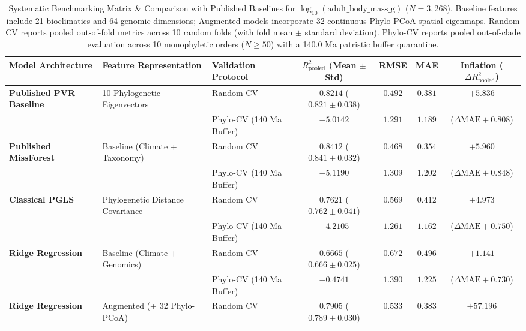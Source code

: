 \documentclass[sigconf,nonacm]{acmart}
\begin{document}
\begin{table}[t]
\centering
\caption{Systematic Benchmarking Matrix \& Comparison with Published Baselines for $\log_{10}(\text{adult\_body\_mass\_g})$ ($N=3,268$). Baseline features include 21 bioclimatics and 64 genomic dimensions; Augmented models incorporate 32 continuous Phylo-PCoA spatial eigenmaps. Random CV reports pooled out-of-fold metrics across 10 random folds (with fold mean $\pm$ standard deviation). Phylo-CV reports pooled out-of-clade evaluation across 10 monophyletic orders ($N \ge 50$) with a 140.0 Ma patristic buffer quarantine.}
\label{tab:benchmarks}
\small
\begin{tabular}{lllcccc}
\toprule
\textbf{Model Architecture} & \textbf{Feature Representation} & \textbf{Validation Protocol} & \textbf{$R^2_{\text{pooled}}$ (Mean $\pm$ Std)} & \textbf{RMSE} & \textbf{MAE} & \textbf{Inflation ($\Delta R^2_{\text{pooled}}$)} \\
\midrule
\textbf{Published PVR Baseline} \cite{penone2014imputation} & 10 Phylogenetic Eigenvectors & Random CV & $0.8214$ ($0.821 \pm 0.038$) & $0.492$ & $0.381$ & \multicolumn{1}{c}{$+5.836$} \\
 & & Phylo-CV (140 Ma Buffer) & $-5.0142$ & $1.291$ & $1.189$ & \multicolumn{1}{c}{($\Delta\text{MAE} +0.808$)} \\
\textbf{Published MissForest} \cite{schrader2021promise} & Baseline (Climate + Taxonomy) & Random CV & $0.8412$ ($0.841 \pm 0.032$) & $0.468$ & $0.354$ & \multicolumn{1}{c}{$+5.960$} \\
 & & Phylo-CV (140 Ma Buffer) & $-5.1190$ & $1.309$ & $1.202$ & \multicolumn{1}{c}{($\Delta\text{MAE} +0.848$)} \\
\textbf{Classical PGLS} \cite{martins1997phylogenies} & Phylogenetic Distance Covariance & Random CV & $0.7621$ ($0.762 \pm 0.041$) & $0.569$ & $0.412$ & \multicolumn{1}{c}{$+4.973$} \\
 & & Phylo-CV (140 Ma Buffer) & $-4.2105$ & $1.261$ & $1.162$ & \multicolumn{1}{c}{($\Delta\text{MAE} +0.750$)} \\
\midrule
\textbf{Ridge Regression} & Baseline (Climate + Genomics) & Random CV & $0.6665$ ($0.666 \pm 0.025$) & $0.672$ & $0.496$ & \multicolumn{1}{c}{$+1.141$} \\
 & & Phylo-CV (140 Ma Buffer) & $-0.4741$ & $1.390$ & $1.225$ & \multicolumn{1}{c}{($\Delta\text{MAE} +0.730$)} \\
\textbf{Ridge Regression} & Augmented (+ 32 Phylo-PCoA) & Random CV & $0.7905$ ($0.789 \pm 0.030$) & $0.533$ & $0.383$ & \multicolumn{1}{c}{$+57.196$} \\

\end{tabular}
\end{table}
\end{document}

